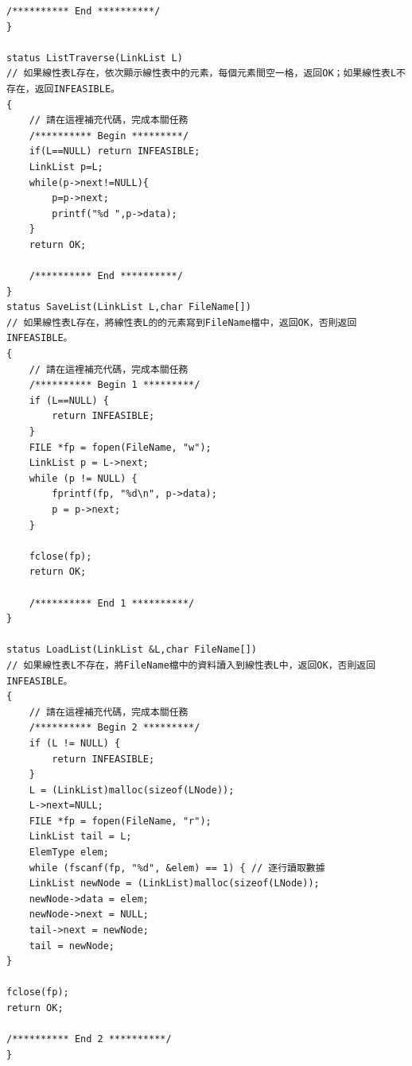 \documentclass[supercite]{Experimental_Report}
\theoremstyle{definition}
\begin{document}
\begin{lstlisting}[style=commonCodeStyle, caption={目标程序}, label={lst:2-17}]
	/********** End **********/
}

status ListTraverse(LinkList L)
// 如果線性表L存在，依次顯示線性表中的元素，每個元素間空一格，返回OK；如果線性表L不存在，返回INFEASIBLE。
{
	// 請在這裡補充代碼，完成本關任務
	/********** Begin *********/
	if(L==NULL) return INFEASIBLE;
	LinkList p=L;
	while(p->next!=NULL){
		p=p->next;     
		printf("%d ",p->data);
	}
	return OK;
	
	/********** End **********/
}
status SaveList(LinkList L,char FileName[])
// 如果線性表L存在，將線性表L的的元素寫到FileName檔中，返回OK，否則返回INFEASIBLE。
{
	// 請在這裡補充代碼，完成本關任務
	/********** Begin 1 *********/
	if (L==NULL) {
		return INFEASIBLE;
	}
	FILE *fp = fopen(FileName, "w");
	LinkList p = L->next;
	while (p != NULL) {
		fprintf(fp, "%d\n", p->data); 
		p = p->next;
	}
	
	fclose(fp);
	return OK;
	
	/********** End 1 **********/
}

status LoadList(LinkList &L,char FileName[])
// 如果線性表L不存在，將FileName檔中的資料讀入到線性表L中，返回OK，否則返回INFEASIBLE。
{
	// 請在這裡補充代碼，完成本關任務
	/********** Begin 2 *********/
	if (L != NULL) {
		return INFEASIBLE;
	}
	L = (LinkList)malloc(sizeof(LNode));
	L->next=NULL;
	FILE *fp = fopen(FileName, "r");
	LinkList tail = L; 
	ElemType elem;
	while (fscanf(fp, "%d", &elem) == 1) { // 逐行讀取數據
	LinkList newNode = (LinkList)malloc(sizeof(LNode));
	newNode->data = elem;
	newNode->next = NULL;
	tail->next = newNode;
	tail = newNode;
}

fclose(fp);
return OK;

/********** End 2 **********/
}


\end{lstlisting}
\end{document}
